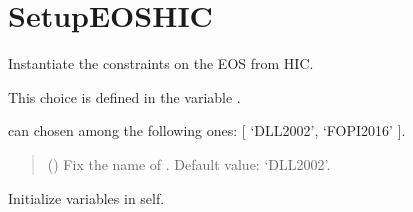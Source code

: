 \documentclass[letterpaper,10pt,english]{sphinxmanual}
\begin{document}
\section{SetupEOSHIC}
\label{\detokenize{source/api/setup_eos_hic:setupeoshic}}\label{\detokenize{source/api/setup_eos_hic::doc}}\label{\detokenize{source/api/setup_eos_hic:module-nucleardatapy.setup_eos_hic}}

\begin{fulllineitems}
\label{\detokenize{source/api/setup_eos_hic:nucleardatapy.setup_eos_hic.SetupEOSHIC}}
\pysigstartsignatures
\pysiglinewithargsret
{}
{}
{}
\pysigstopsignatures
\sphinxAtStartPar
Instantiate the constraints on the EOS from HIC.

\sphinxAtStartPar
This choice is defined in the variable .

\sphinxAtStartPar
{} can chosen among the following ones: {[} ‘DLL\sphinxhyphen{}2002’, ‘FOPI\sphinxhyphen{}2016’ {]}.
\begin{quote}\begin{description}
\sphinxAtStartPar
{} (\sphinxstyleliteralemphasis{\sphinxupquote{, }}) \textendash{} Fix the name of . Default value: ‘DLL\sphinxhyphen{}2002’.

\end{description}\end{quote}

\sphinxAtStartPar
{}

\begin{fulllineitems}
\label{\detokenize{source/api/setup_eos_hic:nucleardatapy.setup_eos_hic.SetupEOSHIC.init_self}}
\pysigstartsignatures
\pysiglinewithargsret
{}
{}
{}
\pysigstopsignatures
\sphinxAtStartPar
Initialize variables in self.


\end{fulllineitems}
\end{fulllineitems}
\end{document}
